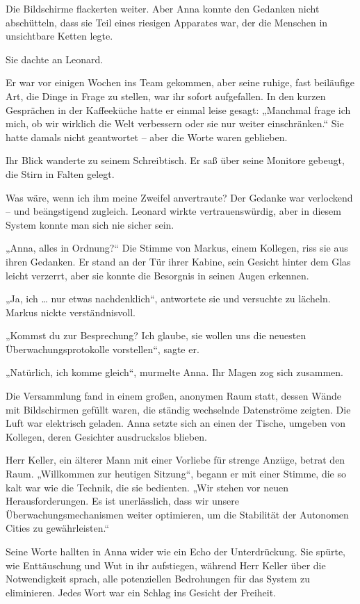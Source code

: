 \documentclass[
]{article}
\begin{document}
Die Bildschirme flackerten weiter. Aber Anna konnte den Gedanken nicht abschütteln, dass sie Teil eines riesigen Apparates war, der die Menschen in unsichtbare Ketten legte.

Sie dachte an Leonard.

Er war vor einigen Wochen ins Team gekommen, aber seine ruhige, fast beiläufige Art, die Dinge in Frage zu stellen, war ihr sofort aufgefallen. In den kurzen Gesprächen in der Kaffeeküche hatte er einmal leise gesagt: „Manchmal frage ich mich, ob wir wirklich die Welt verbessern oder sie nur weiter einschränken.`` Sie hatte damals nicht geantwortet -- aber die Worte waren geblieben.

Ihr Blick wanderte zu seinem Schreibtisch. Er saß über seine Monitore gebeugt, die Stirn in Falten gelegt.

Was wäre, wenn ich ihm meine Zweifel anvertraute? Der Gedanke war verlockend -- und beängstigend zugleich. Leonard wirkte vertrauenswürdig, aber in diesem System konnte man sich nie sicher sein.

„Anna, alles in Ordnung?{\kern0pt}`` Die Stimme von Markus, einem Kollegen, riss sie aus ihren Gedanken. Er stand an der Tür ihrer Kabine, sein Gesicht hinter dem Glas leicht verzerrt, aber sie konnte die Besorgnis in seinen Augen erkennen.

„Ja, ich \ldots{} nur etwas nachdenklich``, antwortete sie und versuchte zu lächeln. Markus nickte verständnisvoll.

„Kommst du zur Besprechung? Ich glaube, sie wollen uns die neuesten Überwachungsprotokolle vorstellen``, sagte er.

„Natürlich, ich komme gleich``, murmelte Anna. Ihr Magen zog sich zusammen.

Die Versammlung fand in einem großen, anonymen Raum statt, dessen Wände mit Bildschirmen gefüllt waren, die ständig wechselnde Datenströme zeigten. Die Luft war elektrisch geladen. Anna setzte sich an einen der Tische, umgeben von Kollegen, deren Gesichter ausdruckslos blieben.

Herr Keller, ein älterer Mann mit einer Vorliebe für strenge Anzüge, betrat den Raum. „Willkommen zur heutigen Sitzung``, begann er mit einer Stimme, die so kalt war wie die Technik, die sie bedienten. „Wir stehen vor neuen Herausforderungen. Es ist unerlässlich, dass wir unsere Überwachungsmechanismen weiter optimieren, um die Stabilität der Autonomen Cities zu gewährleisten.``

Seine Worte hallten in Anna wider wie ein Echo der Unterdrückung. Sie spürte, wie Enttäuschung und Wut in ihr aufstiegen, während Herr Keller über die Notwendigkeit sprach, alle potenziellen Bedrohungen für das System zu eliminieren. Jedes Wort war ein Schlag ins Gesicht der Freiheit.
\end{document}
